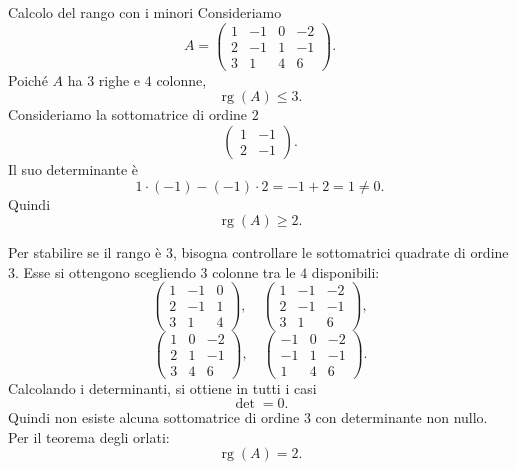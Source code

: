 \documentclass[a4paper]{article}
\begin{document}
\begin{snippetexample}{Calcolo del rango con i minori}
    Consideriamo
    \[
        A=
        \begin{pmatrix}
            1 & -1 & 0 & -2\\
            2 & -1 & 1 & -1\\
            3 & 1 & 4 & 6
        \end{pmatrix}.
    \]
    Poiché \(A\) ha \(3\) righe e \(4\) colonne,
    \[
        \operatorname{rg}(A)\leq 3.
    \]
    Consideriamo la sottomatrice di ordine \(2\)
    \[
        \begin{pmatrix}
            1 & -1\\
            2 & -1
        \end{pmatrix}.
    \]
    Il suo determinante è
    \[
        1\cdot(-1)-(-1)\cdot 2
        =
        -1+2
        =
        1\neq 0.
    \]
    Quindi
    \[
        \operatorname{rg}(A)\geq 2.
    \]

    Per stabilire se il rango è \(3\), bisogna controllare le sottomatrici quadrate di ordine \(3\). Esse si ottengono scegliendo \(3\) colonne tra le \(4\) disponibili:
    \[
        \begin{pmatrix}
            1 & -1 & 0\\
            2 & -1 & 1\\
            3 & 1 & 4
        \end{pmatrix},
        \quad
        \begin{pmatrix}
            1 & -1 & -2\\
            2 & -1 & -1\\
            3 & 1 & 6
        \end{pmatrix},
    \]
    \[
        \begin{pmatrix}
            1 & 0 & -2\\
            2 & 1 & -1\\
            3 & 4 & 6
        \end{pmatrix},
        \quad
        \begin{pmatrix}
            -1 & 0 & -2\\
            -1 & 1 & -1\\
            1 & 4 & 6
        \end{pmatrix}.
    \]
    Calcolando i determinanti, si ottiene in tutti i casi
    \[
        \det=0.
    \]
    Quindi non esiste alcuna sottomatrice di ordine \(3\) con determinante non nullo. Per il teorema degli orlati:
    \[
        \operatorname{rg}(A)=2.
    \]
\end{snippetexample}
\end{document}
